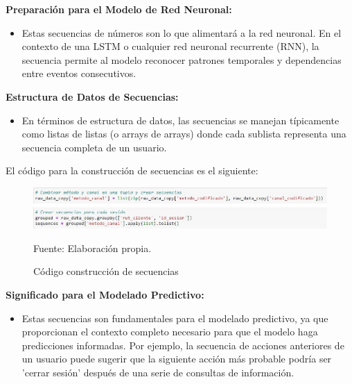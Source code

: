 \textbf{Preparación para el Modelo de Red Neuronal:}

\begin{itemize}
    \item Estas secuencias de números son lo que alimentará a la red neuronal. En el contexto de una LSTM o cualquier red neuronal recurrente (RNN), la secuencia permite al modelo reconocer patrones temporales y dependencias entre eventos consecutivos.
\end{itemize}

\textbf{Estructura de Datos de Secuencias:}

\begin{itemize}
    \item En términos de estructura de datos, las secuencias se manejan típicamente como listas de listas (o arrays de arrays) donde cada sublista representa una secuencia completa de un usuario.
\end{itemize}

El código para la construcción de secuencias es el siguiente:

\begin{figure}[H]
    \begin{minipage}[t]{0.9\textwidth}
        \caption{Código construcción de secuencias}
        \label{construcción_secuencias}        
    \end{minipage}

    \vspace{10pt}

    \begin{minipage}[b]{1\textwidth}
        \centering
        \includegraphics[width=\textwidth]{img/Código construcción de secuencias.jpg}        
    \end{minipage}

    \begin{minipage}[t]{0.9\textwidth}
        Fuente: Elaboración propia.
    \end{minipage}
\end{figure}

\textbf{Significado para el Modelado Predictivo:}

\begin{itemize}
    \item Estas secuencias son fundamentales para el modelado predictivo, ya que proporcionan el contexto completo necesario para que el modelo haga predicciones informadas. Por ejemplo, la secuencia de acciones anteriores de un usuario puede sugerir que la siguiente acción más probable podría ser 'cerrar sesión' después de una serie de consultas de información.
\end{itemize}

